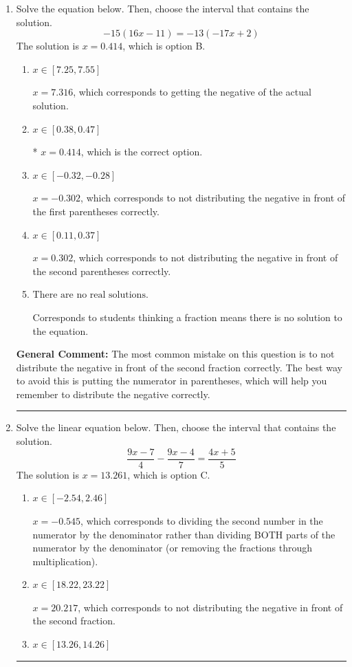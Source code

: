 \documentclass{extbook}[14pt]
\newcommand{\litem}[1]{\item #1

\rule{\textwidth}{0.4pt}}
\begin{document}
\begin{enumerate}\litem{
Solve the equation below. Then, choose the interval that contains the solution.
\[ -15(16x -11) = -13(-17x + 2) \]The solution is \( x = 0.414 \), which is option B.\begin{enumerate}[label=\Alph*.]
\item \( x \in [7.25, 7.55] \)

$x = 7.316$, which corresponds to getting the negative of the actual solution.
\item \( x \in [0.38, 0.47] \)

* $x = 0.414$, which is the correct option.
\item \( x \in [-0.32, -0.28] \)

$x = -0.302$, which corresponds to not distributing the negative in front of the first parentheses correctly.
\item \( x \in [0.11, 0.37] \)

$x = 0.302$, which corresponds to not distributing the negative in front of the second parentheses correctly.
\item \( \text{There are no real solutions.} \)

Corresponds to students thinking a fraction means there is no solution to the equation.
\end{enumerate}

\textbf{General Comment:} The most common mistake on this question is to not distribute the negative in front of the second fraction correctly. The best way to avoid this is putting the numerator in parentheses, which will help you remember to distribute the negative correctly.
}
\litem{
Solve the linear equation below. Then, choose the interval that contains the solution.
\[ \frac{9x -7}{4} - \frac{9x -4}{7} = \frac{4x + 5}{5} \]The solution is \( x = 13.261 \), which is option C.\begin{enumerate}[label=\Alph*.]
\item \( x \in [-2.54, 2.46] \)

 $x = -0.545$, which corresponds to dividing the second number in the numerator by the denominator rather than dividing BOTH parts of the numerator by the denominator (or removing the fractions through multiplication).
\item \( x \in [18.22, 23.22] \)

 $x = 20.217$, which corresponds to not distributing the negative in front of the second fraction.
\item \( x \in [13.26, 14.26] \)


\end{enumerate}}
\end{enumerate}
\end{document}

